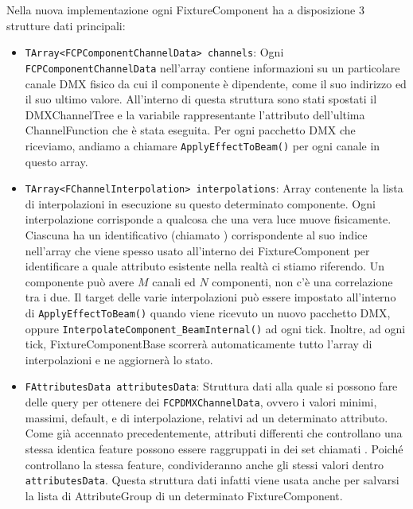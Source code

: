 \documentclass[main.tex]{subfiles}
\begin{document}
Nella nuova implementazione ogni FixtureComponent ha a disposizione 3 strutture dati principali: 
\begin{itemize}
    \item \lstinline{TArray<FCPComponentChannelData> channels}: Ogni \lstinline{FCPComponentChannelData} nell'array contiene informazioni su un particolare canale DMX fisico da cui il componente è dipendente, come il suo indirizzo ed il suo ultimo valore. All'interno di questa struttura sono stati spostati il DMXChannelTree e la variabile rappresentante l'attributo dell'ultima ChannelFunction che è stata eseguita. Per ogni pacchetto DMX che riceviamo, andiamo a chiamare \lstinline{ApplyEffectToBeam()} per ogni canale in questo array.
    \item \lstinline{TArray<FChannelInterpolation> interpolations}: Array contenente la lista di interpolazioni in esecuzione su questo determinato componente. Ogni interpolazione corrisponde a qualcosa che una vera luce muove fisicamente. Ciascuna ha un identificativo (chiamato ) corrispondente al suo indice nell'array che viene spesso usato all'interno dei FixtureComponent per identificare a quale attributo esistente nella realtà ci stiamo riferendo. Un componente può avere $M$ canali ed $N$ componenti, non c'è una correlazione tra i due. Il target delle varie interpolazioni può essere impostato all'interno di \lstinline{ApplyEffectToBeam()} quando viene ricevuto un nuovo pacchetto DMX, oppure \lstinline{InterpolateComponent_BeamInternal()} ad ogni tick. Inoltre, ad ogni tick, FixtureComponentBase scorrerà automaticamente tutto l'array di interpolazioni e ne aggiornerà lo stato.
    \item \lstinline{FAttributesData attributesData}: Struttura dati alla quale si possono fare delle query per ottenere dei \lstinline{FCPDMXChannelData}, ovvero i valori minimi, massimi, default, e di interpolazione, relativi ad un determinato attributo. Come già accennato precedentemente, attributi differenti che controllano una stessa identica feature possono essere raggruppati in dei set chiamati . Poiché controllano la stessa feature, condivideranno anche gli stessi valori dentro \lstinline{attributesData}. Questa struttura dati infatti viene usata anche per salvarsi la lista di AttributeGroup di un determinato FixtureComponent.
\end{itemize}

\end{document}

